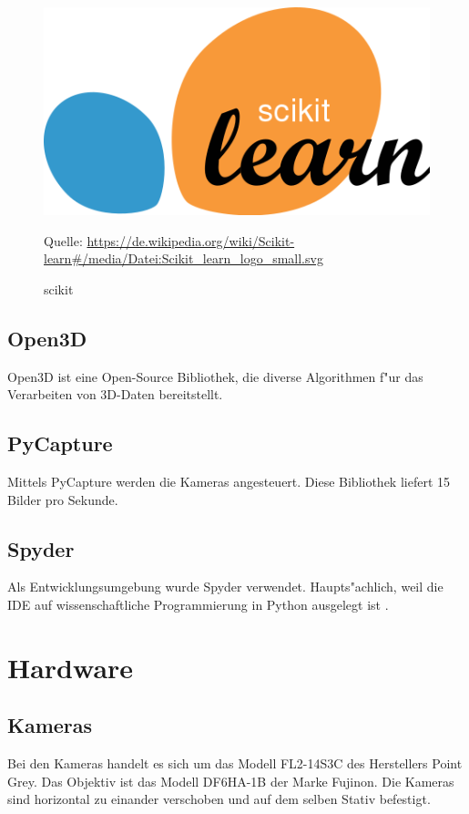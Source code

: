 \begin{figure}[H]
	\includegraphics[scale=0.2]{bilder/scikit}
	\caption[scikit]{scikit}
	\small Quelle: \url{https://de.wikipedia.org/wiki/Scikit-learn#/media/Datei:Scikit_learn_logo_small.svg}
\end{figure}

\subsection{Open3D}
\label{sec:open3d}

Open3D ist eine Open-Source Bibliothek, die diverse Algorithmen f"ur das Verarbeiten von 3D-Daten bereitstellt.

\subsection{PyCapture}
\label{sec:pycapture}

Mittels PyCapture werden die Kameras angesteuert. Diese Bibliothek liefert 15 Bilder pro Sekunde.

\subsection{Spyder}
\label{sec:spyder}

Als Entwicklungsumgebung wurde Spyder verwendet. Haupts"achlich, weil die IDE auf wissenschaftliche Programmierung in Python ausgelegt ist \cite{spy}.

\section{Hardware}
\label{sec:hardware}

\subsection{Kameras}
\label{sec:kameras}

Bei den Kameras handelt es sich um das Modell FL2-14S3C des Herstellers Point Grey. Das Objektiv ist das Modell DF6HA-1B der Marke Fujinon.\newline
Die Kameras sind horizontal zu einander verschoben und auf dem selben Stativ befestigt.
